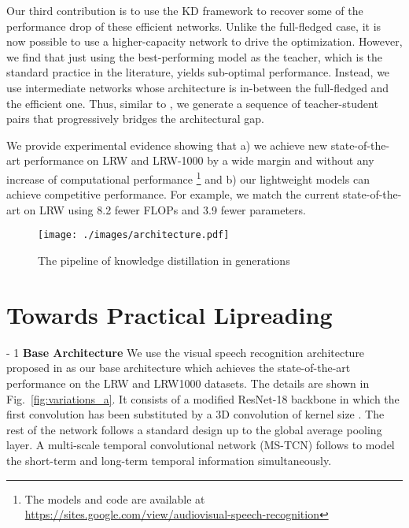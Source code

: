 \documentclass{article}
\begin{document}
Our third contribution is to use the KD framework to recover some of the performance drop of these efficient networks. Unlike the full-fledged case, it is now possible to use a higher-capacity network to drive the optimization. However, we find that just using the best-performing model as the teacher, which is the standard practice in the literature, yields sub-optimal performance. Instead, we use intermediate networks whose architecture is in-between the full-fledged and the efficient one. Thus, similar to \cite{Martinez2020Training}, we generate a sequence of teacher-student pairs that progressively bridges the architectural gap.

We provide experimental evidence showing that a) we achieve new state-of-the-art performance on LRW \cite{chung16b} and LRW-1000 \cite{lrw1000} by a wide margin and without any increase of computational performance \footnote{ The models and code are available at \url{https://sites.google.com/view/audiovisual-speech-recognition}} and b) our lightweight models can achieve competitive performance. For example, we match the current state-of-the-art on LRW \cite{martinez2020lipreading} using 8.2 fewer FLOPs and 3.9 fewer parameters.


\begin{figure}[t]
    \centering
    \texttt{[image: ./images/architecture.pdf]}
    \caption[architecture]{The pipeline of knowledge distillation in generations}
\label{fig:pipeline}
\vspace{-2mm}
\end{figure}




\section{Towards Practical Lipreading}
\label{sec:Architecture}
\looseness - 1
\noindent\textbf{Base Architecture}\quad
We use the visual speech recognition architecture proposed in \cite{martinez2020lipreading} as our base architecture  which achieves the state-of-the-art performance on the LRW and LRW1000 datasets. The details are shown in Fig.~\ref{fig:variations_a}. It consists of a modified ResNet-18 backbone in which the first convolution has been substituted by a 3D convolution of kernel size . The rest of the network follows a standard design up to the global average pooling layer. A multi-scale temporal convolutional network (MS-TCN) follows to model the short-term and long-term temporal information simultaneously.
\end{document}
